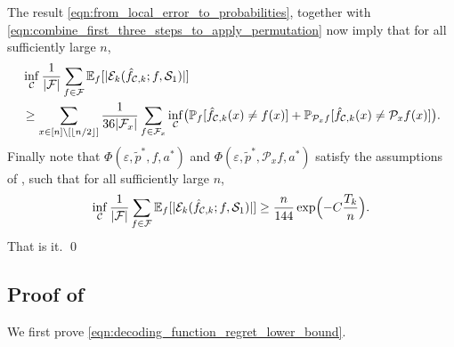 \documentclass[11pt]{article}
\newcommand{\mcC}{\mathcal{C}}
\newcommand{\mcE}{\mathcal{E}}
\newcommand{\mcF}{\mathcal{F}}
\newcommand{\mcP}{\mathcal{P}}
\newcommand{\mcS}{\mathcal{S}}
\newcommand{\mbbP}{\mathbb{P}}
\newcommand{\mbbE}{\mathbb{E}}
\DeclarePairedDelimiter\floor{\lfloor}{\rfloor}
\theoremstyle{definition}
\theoremstyle{definition}
\begin{document}
The result \eqref{eqn:from_local_error_to_probabilities}, together with \eqref{eqn:combine_first_three_steps_to_apply_permutation} now imply that for all sufficiently large $n$,
\begin{align}
	 &
	\inf_{\mcC}
	\frac{1}{|\mcF|}
	\sum_{f\in\mcF}
	\mbbE_{f}[
		|\mcE_k(\hat{f}_{\mcC,k};f,\mcS_1)|
	]
	\\
	 &
	\geq
	\sum_{x\in[n]\setminus[\floor{n/2}]}
	\frac{1}{36|\mcF_x|}
	\sum_{f\in\mcF_x}
	\inf_{\mcC}
	\bigl(
	\mbbP_{f}[
			\hat{f}_{\mcC,k}(x)\neq f(x)
		]
	+
	\mbbP_{\mcP_xf}[
			\hat{f}_{\mcC,k}(x) \neq \mcP_xf(x)
		]
	\bigr)
	.
	\nonumber
\end{align}
Finally note that $\Phi(\varepsilon,\tilde{p}^*,f,a^*)$ and $\Phi(\varepsilon,\tilde{p}^*,\mcP_xf,a^*)$ satisfy the assumptions of , such that for all sufficiently large $n$,
\begin{equation}
	\inf_{\mcC}
	\frac{1}{|\mcF|}
	\sum_{f\in\mcF}
	\mbbE_{f}[
		|\mcE_k(\hat{f}_{\mcC,k};f,\mcS_1)|
	]
	\geq
	\frac{n}{144}
	\exp
	\Bigl(
	-
	C\frac{T_{k}}{n}
	\Bigr)
	.
\end{equation}
That is it.
\qed

\subsection{Proof of \texorpdfstring{}{decoding function regret lower bound}}
\label{sec:proof_of_decoding_function_regret_lower_bound}

We first prove \eqref{eqn:decoding_function_regret_lower_bound}.
\end{document}

